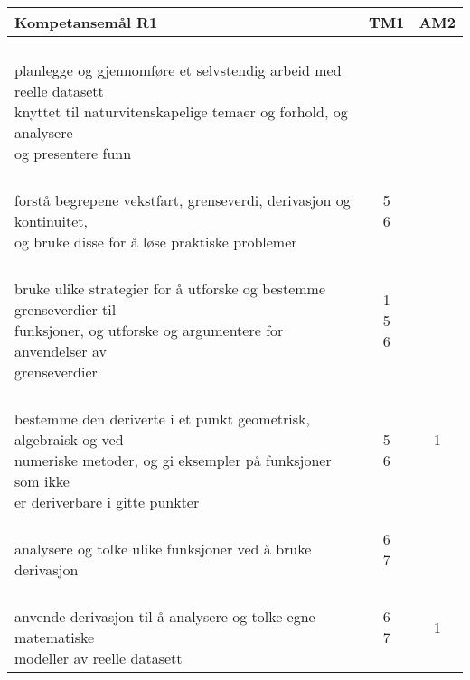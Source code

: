 \documentclass{article}
\begin{document}
\begin{center}
	\begin{tabular}{p{10.5cm} | c | c |} 
		\textbf{Kompetansemål R1} &	TM1 &AM2 \\ \hline
		\shortstack[l]{\\ planlegge og gjennomføre et selvstendig arbeid med reelle datasett\\ knyttet til naturvitenskapelige temaer og forhold, og analysere\\ og presentere funn
		} &\shortstack{} &\shortstack{} \\ \hline
	
		\shortstack[l]{\\ forstå begrepene vekstfart, grenseverdi, derivasjon og kontinuitet,\\ og bruke disse for å løse praktiske problemer
		} &\shortstack{5\\6} &\shortstack{3} \\ \hline
	
		\shortstack[l]{\\ bruke ulike strategier for å utforske og bestemme grenseverdier til \\funksjoner, og utforske og argumentere for anvendelser av \\grenseverdier
		} &\shortstack{1\\5\\6} &\shortstack{1} \\ \hline		
	

		\shortstack[l]{\\ bestemme den deriverte i et punkt geometrisk, algebraisk og ved \\ numeriske metoder, og gi eksempler på funksjoner som ikke \\ er deriverbare i gitte punkter
		} &\shortstack{5\\6\\{}} &\shortstack{1\\{}\\{}} \\ \hline		
	
		\shortstack[l]{\\ analysere og tolke ulike funksjoner ved å bruke derivasjon \\ \phantom{a}
		} &\shortstack{6\\7} &\shortstack{} \\ \hline	
	
		\shortstack[l]{\\ anvende derivasjon til å analysere og tolke egne matematiske \\modeller av reelle datasett
		} &
		\shortstack{6 \\ 7} &\shortstack{1\\{}} \\ \hline	
		

\end{tabular}
\end{center}
\end{document}

